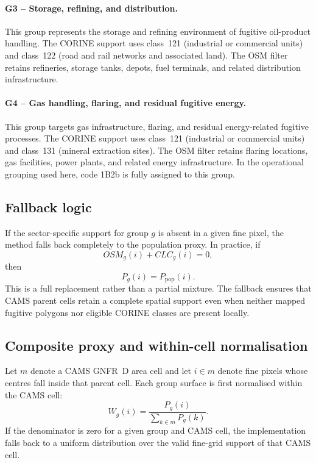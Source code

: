 \paragraph{G3 -- Storage, refining, and distribution.}
This group represents the storage and refining environment of fugitive
oil-product handling. The CORINE support uses class~121 (industrial or
commercial units) and class~122 (road and rail networks and associated
land). The OSM filter retains refineries, storage tanks, depots, fuel
terminals, and related distribution infrastructure.

\paragraph{G4 -- Gas handling, flaring, and residual fugitive energy.}
This group targets gas infrastructure, flaring, and residual
energy-related fugitive processes. The CORINE support uses class~121
(industrial or commercial units) and class~131 (mineral extraction
sites). The OSM filter retains flaring locations, gas facilities, power
plants, and related energy infrastructure. In the operational grouping
used here, code 1B2b is fully assigned to this group.

\subsection{Fallback logic}

If the sector-specific support for group $g$ is absent in a given fine
pixel, the method falls back completely to the population proxy. In
practice, if
\begin{equation}
  OSM_g(i) + CLC_g(i) = 0,
\end{equation}
then
\begin{equation}
  P_g(i) = P_{\mathrm{pop}}(i).
\end{equation}
This is a full replacement rather than a partial mixture. The fallback
ensures that CAMS parent cells retain a complete spatial support even
when neither mapped fugitive polygons nor eligible CORINE classes are
present locally.

\subsection{Composite proxy and within-cell normalisation}

Let $m$ denote a CAMS GNFR~D area cell and let $i \in m$ denote fine
pixels whose centres fall inside that parent cell. Each group surface is
first normalised within the CAMS cell:
\begin{equation}
  W_g(i) =
  \frac{P_g(i)}
       {\displaystyle\sum_{k \in m} P_g(k)}.
\end{equation}
If the denominator is zero for a given group and CAMS cell, the
implementation falls back to a uniform distribution over the valid
fine-grid support of that CAMS cell.

